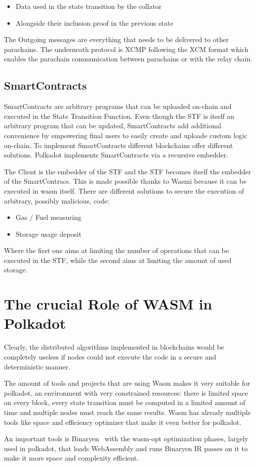 \begin{itemize}
  \item Data used in the state transition by the collator
  \item Alongside their inclusion proof in the previous state
\end{itemize}

The Outgoing messages are everything that needs to be delivered to other parachains. The underneath protocol is XCMP following the XCM format which enables the parachain communication between parachains or with the relay chain.

\subsection{SmartContracts}

SmartContracts are arbitrary programs that can be uploaded on-chain and executed in the State Transition Function. Even though the STF is itself an arbitrary program that can be updated, SmartContracts add additional convenience by empowering final users to easily create and uploade custom logic on-chain. To implement SmartContracts different blockchains offer different solutions. Polkadot implements SmartContracts via a recursive embedder.


The Client is the embedder of the STF and the STF becomes itself the embedder of the SmartContracs. This is made possible thanks to Wasmi because it can be executed in wasm itself. There are different solutions to secure the execution of arbitrary, possibly malicious, code:

\begin{itemize}
  \item Gas / Fuel measuring
  \item Storage usage deposit
\end{itemize}

Where the first one aims at limiting the number of operations that can be executed in the STF, while  the second aims at limiting the amount of used storage.

\section{The crucial Role of WASM in Polkadot}

Clearly, the distributed algorithms implemented in blockchains would be completely useless if nodes could not execute the code in a secure and deterministic manner.

The amount of tools and projects that are using Wasm makes it very suitable for polkadot, an environment with very constrained resources: there is limited space on every block, every state transition must be computed in a limited amount of time and multiple nodes must reach the same results. Wasm has already multiple tools like space and efficiency optimizer that make it even better for polkadot.

An important tools is Binaryen~\cite{binaryen} with the wasm-opt optimization phases, largely used in polkadot, that loads WebAssembly and runs Binaryen IR passes on it to make it more space and complexity efficient.

